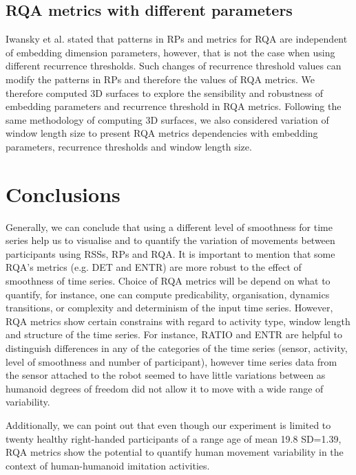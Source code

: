 \documentclass[fleqn,10pt]{wlscirep}
\begin{document}
\subsection*{RQA metrics with different parameters}
Iwansky et al. \cite{iwanski1998} stated that patterns in RPs and 
metrics for RQA are independent of embedding dimension parameters, 
however, that is not the case when using 
different recurrence thresholds. Such changes of recurrence threshold values 
can modify the patterns in RPs and therefore the values of RQA metrics.
We therefore computed 3D surfaces to explore the sensibility and robustness of 
embedding parameters and recurrence threshold in RQA  metrics. Following the 
same methodology of computing 3D surfaces, we also considered variation of 
window length size to present RQA metrics dependencies with embedding 
parameters, recurrence thresholds and window length size.



\section*{Conclusions}
Generally, we can conclude that using a different level of 
smoothness for time series help us to visualise and to quantify 
the variation of movements 
between participants using RSSs, RPs and RQA. 
It is important to mention that some RQA's metrics 
(e.g. DET and ENTR) are more robust to the effect of 
smoothness of time series.
Choice of RQA metrics will be depend on 
what to quantify, for instance, one can compute 
predicability, organisation,  
dynamics transitions, or complexity and determinism of the 
input time series. However, RQA metrics show certain constrains with 
regard to activity type, window length and structure of the time series.
For instance, RATIO and ENTR are helpful to distinguish 
differences in any of the categories of the time series (sensor, activity, 
level of smoothness and number of participant), however time series
data from the sensor attached to the robot seemed to have 
little variations between as humanoid degrees of freedom 
did not allow it to move with a wide range of variability. 

Additionally, we can point out that even though our experiment is 
limited to twenty healthy right-handed participants of a range age 
of mean 19.8 SD=1.39, RQA metrics show the potential to quantify 
human movement variability in the context of 
human-humanoid imitation activities.
	
\end{document}
